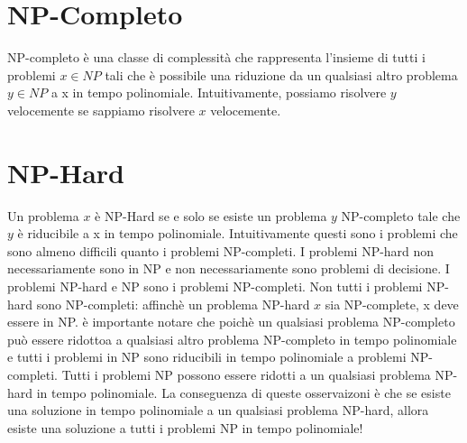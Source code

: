 \documentclass[12pt, a4paper, openany]{book}
\begin{document}
\section{NP-Completo}
NP-completo è una classe di complessità che rappresenta l'insieme di tutti i problemi $x\in NP$ tali che è possibile una riduzione da un qualsiasi altro problema $y \in NP$ a x in tempo polinomiale.
Intuitivamente, possiamo risolvere $y$ velocemente se sappiamo risolvere $x$ velocemente.
\section{NP-Hard}
Un problema $x$ è NP-Hard se e solo se esiste un problema $y$ NP-completo tale che $y$ è riducibile a x in tempo polinomiale.
Intuitivamente questi sono i problemi che sono almeno difficili quanto i problemi NP-completi.
I problemi NP-hard non necessariamente sono in NP e non necessariamente sono problemi di decisione.
I problemi NP-hard e NP sono i problemi NP-completi.
Non tutti i problemi NP-hard sono NP-completi: affinchè un problema NP-hard $x$ sia NP-complete, x deve essere in NP.
è importante notare che poichè un qualsiasi problema NP-completo può essere ridottoa a qualsiasi altro problema NP-completo in tempo polinomiale e tutti i problemi in NP sono riducibili in tempo polinomiale a problemi NP-completi.
Tutti i problemi NP possono essere ridotti a un qualsiasi problema NP-hard in tempo polinomiale.
La conseguenza di queste osservaizoni è che se esiste una soluzione in tempo polinomiale a un qualsiasi problema NP-hard, allora esiste una soluzione a tutti i problemi NP in tempo polinomiale!
\end{document}
